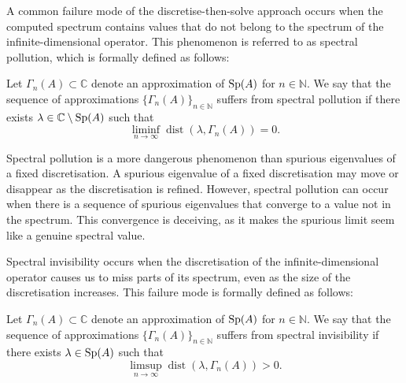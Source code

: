  A common failure mode of the discretise-then-solve approach occurs when the computed spectrum contains values that do not belong to the spectrum of the infinite-dimensional operator. This phenomenon is referred to as spectral pollution, which is formally defined as follows:
\begin{definition}
    Let $\Gamma_n(A) \subset \mathbb{C}$ denote an approximation of $\operatorname{Sp}\!\left(A\right)$ for $n \in \mathbb{N}.$ We say that the sequence of approximations $\{\Gamma_n(A)\}_{n \in \mathbb{N}}$ suffers from spectral pollution if there exists $\lambda \in \mathbb{C} \setminus \operatorname{Sp}\!\left(A\right)$ such that 
    \begin{equation}
        \liminf_{n \rightarrow \infty} \operatorname{dist}(\lambda, \Gamma_n(A))= 0.
    \end{equation}
\end{definition}

Spectral pollution is a more dangerous phenomenon than spurious eigenvalues of a fixed discretisation. A spurious eigenvalue of a fixed discretisation may move or disappear as the discretisation is refined. However, spectral pollution can occur when there is a sequence of spurious eigenvalues that converge to a value not in the spectrum. This convergence is deceiving, as it makes the spurious limit seem like a genuine spectral value. 

Spectral invisibility occurs when the discretisation of the infinite-dimensional operator causes us to miss parts of its spectrum, even as the size of the discretisation increases. This failure mode is formally defined as follows:
\begin{definition}
    Let $\Gamma_n(A) \subset \mathbb{C}$ denote an approximation of $\operatorname{Sp}\!\left(A\right)$ for $n \in \mathbb{N}.$ We say that the sequence of approximations $\{\Gamma_n(A)\}_{n \in \mathbb{N}}$ suffers from spectral invisibility if there exists $\lambda \in \operatorname{Sp}\!\left(A\right)$ such that 
        \begin{equation}
        \limsup_{n \rightarrow \infty} \operatorname{dist}(\lambda, \Gamma_n(A))> 0.
    \end{equation}
\end{definition}

